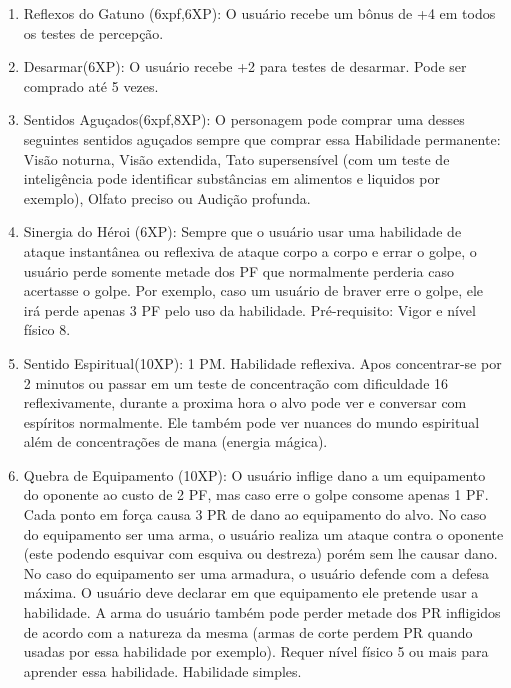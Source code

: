 \begin{enumerate}
	\item Reflexos do Gatuno (6xpf,6XP): O usuário recebe um bônus de +4 em todos os testes de percepção.

 	\item Desarmar(6XP): O usuário recebe +2 para testes de desarmar. Pode ser comprado até 5 vezes.

	\item Sentidos Aguçados(6xpf,8XP): O personagem pode comprar uma desses seguintes sentidos aguçados sempre que comprar essa Habilidade permanente: Visão noturna, Visão extendida, Tato supersensível (com um teste de inteligência pode identificar substâncias em alimentos e liquidos por exemplo), Olfato preciso ou Audição profunda.

	\item Sinergia do Héroi (6XP): Sempre que o usuário usar uma habilidade de ataque instantânea ou reflexiva de ataque corpo a corpo e errar o golpe, o usuário perde somente metade dos PF que normalmente perderia caso acertasse o golpe. Por exemplo, caso um usuário de braver erre o golpe, ele irá perde apenas 3 PF pelo uso da habilidade. Pré-requisito: Vigor e nível físico 8.

	\item Sentido Espiritual(10XP): 1 PM. Habilidade reflexiva.\newline
Apos concentrar-se por 2 minutos ou passar em um teste de concentração com dificuldade 16 reflexivamente, durante a proxima hora o alvo pode ver e conversar com espíritos normalmente. Ele também pode ver nuances do mundo espiritual além de concentrações de mana (energia mágica). 

	\item Quebra de Equipamento (10XP): O usuário inflige dano a um equipamento do oponente ao custo de 2 PF, mas caso erre o golpe consome apenas 1 PF. Cada ponto em força causa 3 PR de dano ao equipamento do alvo. No caso do equipamento ser uma arma, o usuário realiza um ataque contra o oponente (este podendo esquivar com esquiva ou destreza) porém sem lhe causar dano. No caso do equipamento ser uma armadura, o usuário defende com a defesa máxima. O usuário deve declarar em que equipamento ele pretende usar a habilidade.  A arma do usuário também pode perder metade dos PR infligidos de acordo com a natureza da mesma (armas de corte perdem PR quando usadas por essa habilidade por exemplo). Requer nível físico 5 ou mais para aprender essa habilidade. Habilidade simples.

	

\end{enumerate}
